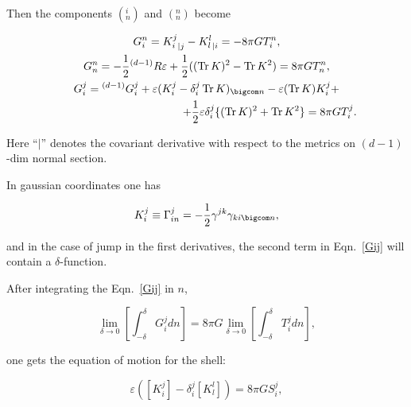 Then the components $\left(_n^i\right)$ and $\left(_n^n\right)$ become

\begin{gather}

G_i^n = {K_i^j}_{|j}- {K_l^l}_{|i} = -8\pi G T_i^n,

\label{Gin}\\

G_n^n = -\frac{1}{2}{ ^{(d-1)}R}\varepsilon + \frac{1}{2}((\mathop{\rm Tr}K)^2 - \mathop{\rm Tr}K^2) = 8\pi G T_n^n,

\label{Gnn}\\

G_i^j = { ^{(d-1)}}G_i^j + \varepsilon(K_i^j - \delta_i^j\mathop{\rm Tr}K)_{\bigcom n} - \varepsilon(\mathop{\rm Tr}K)K_i^j + \\

\hspace{4cm}

+ \frac{1}{2}\varepsilon\delta_i^j\{(\mathop{\rm Tr}K)^2 + \mathop{\rm Tr}K^2\} =  8\pi GT_i^j

\label{Gij}.

\end{gather}

Here ``$|$'' denotes the covariant derivative with respect to the metrics on $(d-1)$-dim normal section. 

In gaussian coordinates one has 

$$

K_i^j \equiv \Gamma_{in}^j =-\frac{1}{2}\gamma^{jk}\gamma_{ki\bigcom n},

$$ 

and in the case of jump in the first derivatives, the second term in Eqn.~\eqref{Gij} will contain a $\delta$-function. 

After integrating the Eqn.~\eqref{Gij} in $n$,

$$

\lim_{\delta \to 0}\left[\int_{-\delta}^{\delta}G_i^j dn\right] = 8\pi G\lim_{\delta \to 0}\left[\int_{-\delta}^{\delta}T_i^j dn\right],

$$

one gets the equation of motion for the shell:

\begin{equation}

\label{EoM}

\varepsilon([K_i^j]-\delta_i^j [K_l^l]) = 8\pi G S_i^j,

\end{equation}

